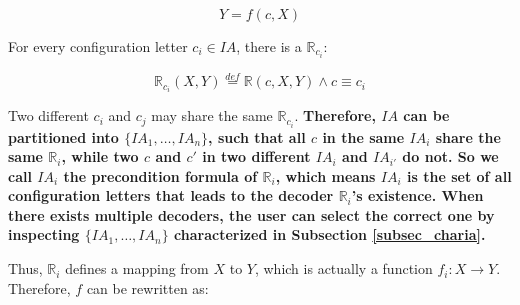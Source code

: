 \documentclass[journal]{IEEEtran}
\begin{document}
\begin{equation}\label{equ_fdf}
Y=f(c,X)
\end{equation}

For every configuration letter $c_i\in IA$,
there is a $\mathbb{R}_{c_i}$:

\begin{equation}\label{equ_fdRci}
\mathbb{R}_{c_i}(X,Y)\stackrel{def}{=}\mathbb{R}(c,X,Y) \wedge c\equiv c_i
\end{equation}

%
%
%
%
%
%
Two different $c_i$ and $c_j$ may share the same $\mathbb{R}_{c_i}$.
%
\textbf{Therefore,
$IA$ can be partitioned into $\{IA_1,\dots,IA_n\}$,
such that all $c$ in the same $IA_i$ share the same $\mathbb{R}_i$,
while two $c$ and $c'$ in two different $IA_i$ and $IA_{i'}$ do not.
So we call $IA_i$ the precondition formula of $\mathbb{R}_i$,
which means $IA_i$ is the set of all configuration letters that leads to the decoder $\mathbb{R}_i$'s existence.
When there exists multiple decoders,
the user can select the correct one by inspecting $\{IA_1,\dots,IA_n\}$ characterized in Subsection \ref{subsec_charia}.
}

Thus,
$\mathbb{R}_i$ defines a mapping from $X$ to $Y$,
which is actually a function $f_i:X\to Y$.
Therefore,
$f$ can be rewritten as:
\end{document}
